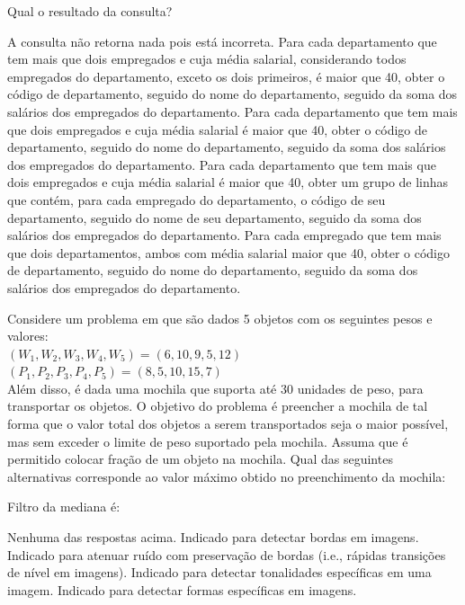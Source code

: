 \documentclass[12pt, addpoints]{exam}
\begin{document}
\begin{questions}
Qual o resultado da consulta?
\begin{choices}
\choice A consulta não retorna nada pois está incorreta.
\choice Para cada departamento que tem mais que dois empregados e cuja média salarial, considerando todos empregados do departamento, exceto os dois primeiros, é maior que 40, obter o código de departamento, seguido do nome do departamento, seguido da soma dos salários dos empregados do departamento.
\choice Para cada departamento que tem mais que dois empregados e cuja média salarial é maior que 40, obter o código de departamento, seguido do nome do departamento, seguido da soma dos salários dos empregados do departamento.
\choice Para cada departamento que tem mais que dois empregados e cuja média salarial é maior que 40, obter um grupo de linhas que contém, para cada empregado do departamento, o código de seu departamento, seguido do nome de seu departamento, seguido da soma dos salários dos empregados do departamento.
\choice Para cada empregado que tem mais que dois departamentos, ambos com média salarial maior que 40, obter o código de departamento, seguido do nome do departamento, seguido da soma dos salários dos empregados do departamento.
\end{choices}

\question

Considere um problema em que são dados 5 objetos com os seguintes pesos e valores:\\

 $(W_1, W_2, W_3, W_4, W_5) = (6, 10, 9, 5, 12)$\\

 $(P_1, P_2, P_3, P_4, P_5) = (8, 5, 10, 15, 7)$\\

Além disso, é dada uma mochila que suporta até 30 unidades de peso, para transportar os objetos. O objetivo do problema é preencher a mochila de tal forma que o valor total dos objetos a serem transportados seja o maior possível, mas sem exceder o limite de peso suportado pela mochila. Assuma que é permitido colocar fração de um objeto na mochila. Qual das seguintes alternativas corresponde ao valor máximo obtido no preenchimento da mochila:
\begin{choices}
\end{choices}

\question

Filtro da mediana é:
\begin{choices}
\choice Nenhuma das respostas acima.
\choice Indicado para detectar bordas em imagens.
\choice Indicado para atenuar ruído com preservação de bordas (i.e., rápidas transições de nível em imagens).
\choice Indicado para detectar tonalidades específicas em uma imagem.
\choice Indicado para detectar formas específicas em imagens.
\end{choices}


\end{questions}
\end{document}
